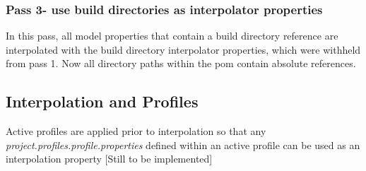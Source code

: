 \documentclass[12pt]{amsart}
\begin{document}
\subsubsection{Pass 3- use build directories as interpolator properties} In this pass, all model properties that contain a build directory reference are interpolated with the build directory interpolator properties, which were withheld from pass 1. Now all directory paths within the pom contain absolute references.

\subsection{Interpolation and Profiles}
Active profiles are applied prior to interpolation so that any \emph{project.profiles.profile.properties} defined within an active profile can be used as an interpolation property [Still to be implemented]
\end{document}
